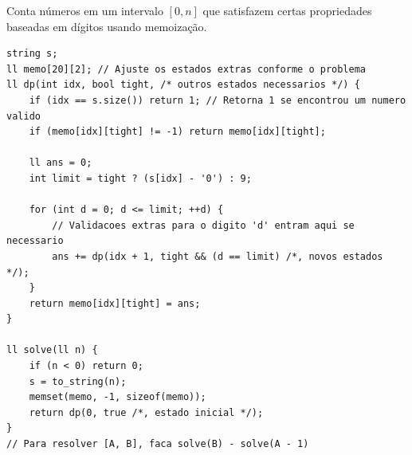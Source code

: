 Conta números em um intervalo $[0, n]$ que satisfazem certas propriedades baseadas em dígitos usando memoização.

\begin{lstlisting}
string s;
ll memo[20][2]; // Ajuste os estados extras conforme o problema
ll dp(int idx, bool tight, /* outros estados necessarios */) {
    if (idx == s.size()) return 1; // Retorna 1 se encontrou um numero valido
    if (memo[idx][tight] != -1) return memo[idx][tight];

    ll ans = 0;
    int limit = tight ? (s[idx] - '0') : 9;
    
    for (int d = 0; d <= limit; ++d) {
        // Validacoes extras para o digito 'd' entram aqui se necessario
        ans += dp(idx + 1, tight && (d == limit) /*, novos estados */);
    }
    return memo[idx][tight] = ans;
}

ll solve(ll n) {
    if (n < 0) return 0;
    s = to_string(n);
    memset(memo, -1, sizeof(memo));
    return dp(0, true /*, estado inicial */);
}
// Para resolver [A, B], faca solve(B) - solve(A - 1)
\end{lstlisting}